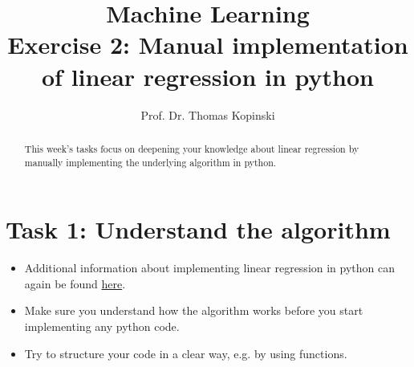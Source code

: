 \documentclass{article}
\title{Machine Learning \\ Exercise 2: Manual implementation of linear regression in python}
\author{Prof. Dr. Thomas Kopinski}
\begin{document}
\maketitle

\begin{abstract}
This week's tasks focus on deepening your knowledge about linear regression by manually implementing the underlying algorithm in python. 
\end{abstract}

\section*{Task 1: Understand the algorithm}

\begin{itemize}
    \item Additional information about implementing linear regression in python can again be found \href{https://github.com/DataScienceLabFHSWF/machine-learning-book/blob/main/notebooks/ch09/ch09.ipynb}{here}.
    \item Make sure you understand how the algorithm works before you start implementing any python code.
    \item Try to structure your code in a clear way, e.g. by using functions.
\end{itemize}

%
%
\end{document}
